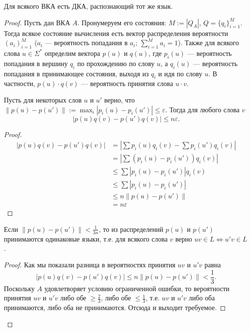 \documentclass[12pt,a4paper]{article}
\begin{document}
    \begin{theorem}
        Для всякого ВКА есть ДКА, распознающий тот же язык.
    \end{theorem}

    \begin{proof}
        Пусть дан ВКА $A$. Пронумеруем его состояния: $M := |Q_A|$, $Q = \{q_i\}_{i=1}^M$. Тогда всякое состояние вычисления есть вектор распределения вероятности $(a_i)_{i=1}^M$ ($a_i$ --- вероятность попадания в $a_i$; $\sum_{i=1}^M a_i = 1$). Также для всякого слова $u \in \Sigma^*$ определим вектора $p(u)$ и $q(u)$, где $p_i(u)$ --- вероятность попадания в вершину $q_i$ по прохождению по слову $u$, а $q_i(u)$ --- вероятность попадания в принимающее состояния, выходя из $q_i$ и идя по слову $u$. В частности, $p(u) \cdot q(v)$ --- вероятность принятия слова $u \cdot v$.
        
        \begin{thlemma}
            Пусть для некоторых слов $u$ и $u'$ верно, что $\|p(u) - p(u')\| := \max_i |p_i(u) - p_i(u')| \leqslant \varepsilon$. Тогда для любого слова $v$
            \[|p(u)q(v) - p(u')q(v)| \leqslant n \varepsilon.\]
        \end{thlemma}

        \begin{proof}
            \begin{align*}
                |p(u)q(v) - p(u')q(v)|
                &= \left|\sum p_i(u)q_i(v) - \sum p_i(u')q_i(v)\right|\\
                &= \left|\sum (p_i(u) - p_i(u'))q_i(v)\right|\\
                &\leqslant \sum |p_i(u) - p_i(u')|q_i(v)\\
                &\leqslant \sum |p_i(u) - p_i(u')|\\
                &\leqslant n \|p(u) - p(u')\|\\
                &= n \varepsilon
            \end{align*}
        \end{proof}

        \begin{corollary}
            Если $\|p(u) - p(u')\| < \frac{1}{3n}$, то из распределений $p(u)$ и $p(u')$ принимаются одинаковые языки, т.е. для всякого слова $v$ верно $uv \in L \Leftrightarrow u'v \in L$.
        \end{corollary}

        \begin{proof}
            Как мы показали разница в вероятностях принятия $uv$ и $u'v$ равна
            \[|p(u)q(v) - p(u')q(v)| \leqslant n \|p(u) - p(u')\| < \frac{1}{3}.\]
            Поскольку $A$ удовлетворяет условию ограниченной ошибки, то вероятности принятия $uv$ и $u'v$ либо обе $\geqslant \frac{2}{3}$, либо обе $\leqslant \frac{1}{3}$, т.е. $uv$ и $u'v$ либо оба принимаются, либо оба не принимаются. Отсюда и выходит требуемое.
        \end{proof}


\end{proof}
\end{document}

